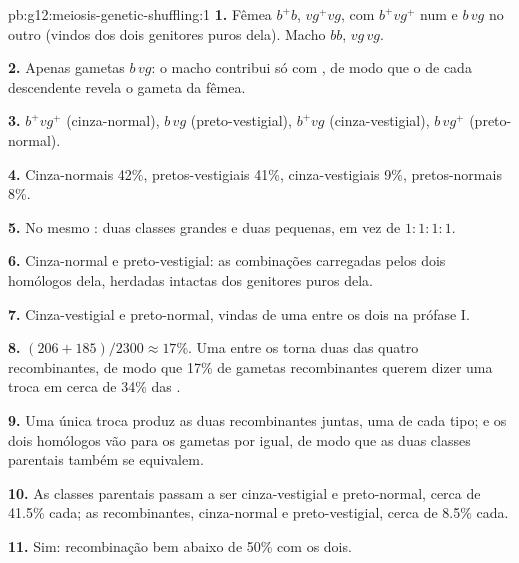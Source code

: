 \begin{solution}{pb:g12:meiosis-genetic-shuffling:1}
\textbf{1.} Fêmea $b^+b$, $vg^+vg$, com $b^+vg^+$ num  e
$b\,vg$ no outro (vindos dos dois genitores puros dela). Macho $bb$,
$vg\,vg$.

\textbf{2.} Apenas gametas $b\,vg$: o macho contribui só com 
, de modo que o  de cada descendente revela o gameta
da fêmea.

\textbf{3.} $b^+vg^+$ (cinza-normal), $b\,vg$ (preto-vestigial),
$b^+vg$ (cinza-vestigial), $b\,vg^+$ (preto-normal).

\textbf{4.} Cinza-normais 42\%, pretos-vestigiais 41\%,
cinza-vestigiais 9\%, pretos-normais 8\%.

\textbf{5.} No mesmo : duas classes grandes e duas pequenas,
em vez de $1:1:1:1$.

\textbf{6.} Cinza-normal e preto-vestigial: as combinações carregadas
pelos dois homólogos dela, herdadas intactas dos genitores puros dela.

\textbf{7.} Cinza-vestigial e preto-normal, vindas de uma 
entre os dois  na prófase I.

\textbf{8.} $(206 + 185)/2300 \approx 17\%$. Uma  entre os
 torna duas das quatro  recombinantes, de modo que 17\%
de gametas recombinantes querem dizer uma troca em cerca de 34\% das
.

\textbf{9.} Uma única troca produz as duas  recombinantes
juntas, uma de cada tipo; e os dois homólogos vão para os gametas por
igual, de modo que as duas classes parentais também se equivalem.

\textbf{10.} As classes parentais passam a ser cinza-vestigial e
preto-normal, cerca de 41.5\% cada; as recombinantes, cinza-normal e
preto-vestigial, cerca de 8.5\% cada.

\textbf{11.} Sim: recombinação bem abaixo de 50\% com os dois.


\end{solution}
